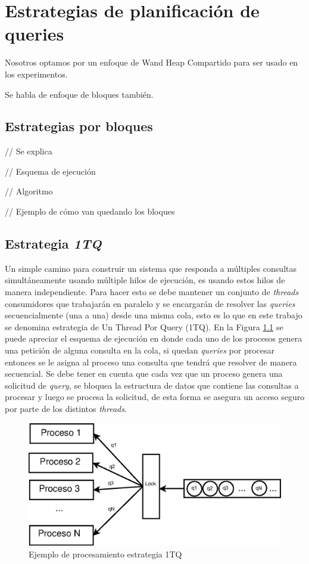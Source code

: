 \chapter{Estrategias de planificación de queries}
\label{cap:planificacion}

Nosotros optamos por un enfoque de Wand Heap Compartido para ser usado en los experimentos.

Se habla de enfoque de bloques también.


\section{Estrategias por bloques}
\label{scheduling:fr}

// Se explica

// Esquema de ejecución

// Algoritmo

// Ejemplo de cómo van quedando los bloques



\section{Estrategia \textit{1TQ}}
\label{scheduling:baseline}
Un simple camino para construir un sistema que responda a múltiples consultas simultáneamente usando múltiple hilos de ejecución, es usando estos hilos de manera independiente. Para hacer esto se debe mantener un conjunto de \textit{threads} consumidores que trabajarán en paralelo y se encargarán de resolver las \textit{queries} secuencialmente (una a una) desde una misma cola, esto es lo que en este trabajo se denomina estrategia de Un Thread Por Query (1TQ). En la Figura \ref{fig:1TQ} se puede apreciar el esquema de ejecución en donde cada uno de los procesos genera una petición de alguna consulta en la cola, si quedan \textit{queries} por procesar entonces se le asigna al proceso una consulta que tendrá que resolver de manera secuencial. Se debe tener en cuenta que cada vez que un proceso genera una solicitud de \textit{query}, se bloquea la estructura de datos que contiene las consultas a procesar y luego se procesa la solicitud, de esta forma se asegura un acceso seguro por parte de los distintos \textit{threads}. 

\begin{figure}[H]
\centering
\includegraphics[scale=.75]{images/1TQ.eps}
\caption{Ejemplo de procesamiento estrategia 1TQ}
\label{fig:1TQ}
\end{figure}

